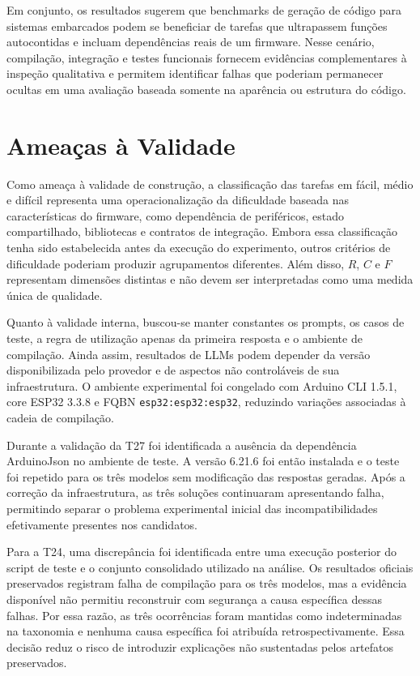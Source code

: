 \documentclass[12pt]{article}
\begin{document}
Em conjunto, os resultados sugerem que benchmarks de geração de código para sistemas embarcados podem se beneficiar de tarefas que ultrapassem funções autocontidas e incluam dependências reais de um firmware. Nesse cenário, compilação, integração e testes funcionais fornecem evidências complementares à inspeção qualitativa e permitem identificar falhas que poderiam permanecer ocultas em uma avaliação baseada somente na aparência ou estrutura do código.

\section{Ameaças à Validade}
\label{sec:ameacas}

Como ameaça à validade de construção, a classificação das tarefas em fácil, médio e difícil representa uma operacionalização da dificuldade baseada nas características do firmware, como dependência de periféricos, estado compartilhado, bibliotecas e contratos de integração. Embora essa classificação tenha sido estabelecida antes da execução do experimento, outros critérios de dificuldade poderiam produzir agrupamentos diferentes. Além disso, $R$, $C$ e $F$ representam dimensões distintas e não devem ser interpretadas como uma medida única de qualidade.

Quanto à validade interna, buscou-se manter constantes os prompts, os casos de teste, a regra de utilização apenas da primeira resposta e o ambiente de compilação. Ainda assim, resultados de LLMs podem depender da versão disponibilizada pelo provedor e de aspectos não controláveis de sua infraestrutura. O ambiente experimental foi congelado com Arduino CLI 1.5.1, core ESP32 3.3.8 e FQBN \texttt{esp32:esp32:esp32}, reduzindo variações associadas à cadeia de compilação.

Durante a validação da T27 foi identificada a ausência da dependência ArduinoJson no ambiente de teste. A versão 6.21.6 foi então instalada e o teste foi repetido para os três modelos sem modificação das respostas geradas. Após a correção da infraestrutura, as três soluções continuaram apresentando falha, permitindo separar o problema experimental inicial das incompatibilidades efetivamente presentes nos candidatos.

Para a T24, uma discrepância foi identificada entre uma execução posterior do script de teste e o conjunto consolidado utilizado na análise. Os resultados oficiais preservados registram falha de compilação para os três modelos, mas a evidência disponível não permitiu reconstruir com segurança a causa específica dessas falhas. Por essa razão, as três ocorrências foram mantidas como indeterminadas na taxonomia e nenhuma causa específica foi atribuída retrospectivamente. Essa decisão reduz o risco de introduzir explicações não sustentadas pelos artefatos preservados.
\end{document}
